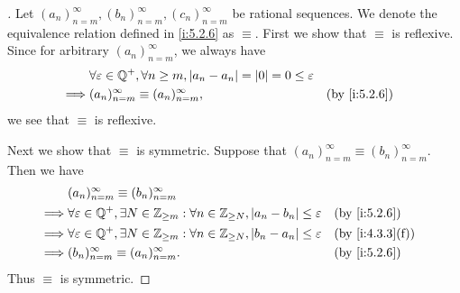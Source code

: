 \begin{proof}[]
  Let \((a_n)_{n = m}^\infty, (b_n)_{n = m}^\infty, (c_n)_{n = m}^\infty\) be rational sequences.
  We denote the equivalence relation defined in \cref{i:5.2.6} as \(\equiv\).
  First we show that \(\equiv\) is reflexive.
  Since for arbitrary \((a_n)_{n = m}^\infty\), we always have
  \begin{align*}
             & \forall \varepsilon \in \Q^+, \forall n \geq m, \abs{a_n - a_n} = \abs{0} = 0 \leq \varepsilon                   \\
    \implies & (a_n)_{n = m}^\infty \equiv (a_n)_{n = m}^\infty,                                              &  & \by{i:5.2.6}
  \end{align*}
  we see that \(\equiv\) is reflexive.

  Next we show that \(\equiv\) is symmetric.
  Suppose that \((a_n)_{n = m}^\infty \equiv (b_n)_{n = m}^\infty\).
  Then we have
  \begin{align*}
             & (a_n)_{n = m}^\infty \equiv (b_n)_{n = m}^\infty                                                                                          \\
    \implies & \forall \varepsilon \in \Q^+, \exists N \in \Z_{\geq m}: \forall n \in \Z_{\geq N}, \abs{a_n - b_n} \leq \varepsilon &  & \by{i:5.2.6}    \\
    \implies & \forall \varepsilon \in \Q^+, \exists N \in \Z_{\geq m}: \forall n \in \Z_{\geq N}, \abs{b_n - a_n} \leq \varepsilon &  & \by{i:4.3.3}[f] \\
    \implies & (b_n)_{n = m}^\infty \equiv (a_n)_{n = m}^\infty.                                                                    &  & \by{i:5.2.6}
  \end{align*}
  Thus \(\equiv\) is symmetric.


\end{proof}
